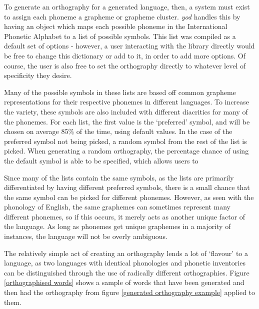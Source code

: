 \documentclass{report}
\begin{document}
	To generate an orthography for a generated language, then, a system must exist to assign each phoneme a grapheme or grapheme cluster. \textit{yod} handles this by having an object which maps each possible phoneme in the International Phonetic Alphabet to a list of possible symbols. This list was compiled as a default set of options - however, a user interacting with the library directly would be free to change this dictionary or add to it, in order to add more options. Of course, the user is also free to set the orthography directly to whatever level of specificity they desire.
	
	Many of the possible symbols in these lists are based off common grapheme representations for their respective phonemes in different languages. To increase the variety, these symbols are also included with different diacritics for many of the phonemes. For each list, the first value is the `preferred' symbol, and will be chosen on average 85\% of the time, using default values. In the case of the preferred symbol not being picked, a random symbol from the rest of the list is picked. When generating a random orthography, the percentage chance of using the default symbol is able to be specified, which allows users to 
	
	Since many of the lists contain the same symbols, as the lists are primarily differentiated by having different preferred symbols, there is a small chance that the same symbol can be picked for different phonemes. However, as seen with the phonology of English, the same graphemes can sometimes represent many different phonemes, so if this occurs, it merely acts as another unique factor of the language. As long as phonemes get unique graphemes in a majority of instances, the language will not be overly ambiguous.
	
	The relatively simple act of creating an orthography lends a lot of `flavour' to a language, as two languages with identical phonologies and phonetic inventories can be distinguished through the use of radically different orthographies. Figure \ref{orthographised words} shows a sample of words that have been generated and then had the orthography from figure \ref{generated orthography example} applied to them.
	
\end{document}
